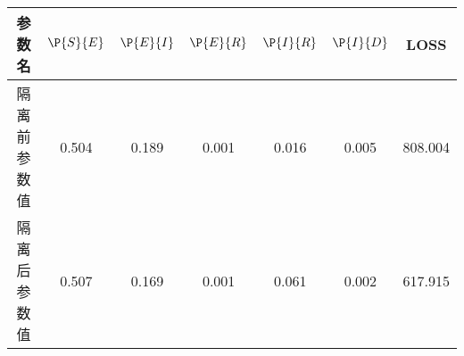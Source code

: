 \begin{tabular}{ccccccc}
\hline
参数名&$\P{S}{E}$&$\P{E}{I}$&$\P{E}{R}$&$\P{I}{R}$&$\P{I}{D}$&LOSS\\
\hline
隔离前参数值&0.504&0.189&0.001&0.016&0.005&808.004\\
隔离后参数值&0.507&0.169&0.001&0.061&0.002&617.915\\
\hline
\end{tabular}